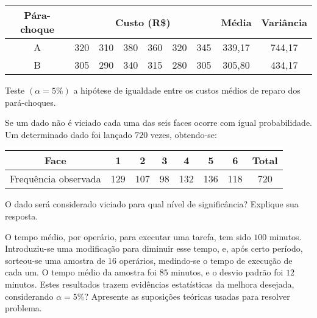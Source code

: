 \documentclass{report}
\begin{document}
\begin{Exercise}
\begin{table}[H]
\centering
\begin{tabular}{ccccccccc}
\hline \hline
Pára-choque&\multicolumn{6}{c}{Custo (R\$)}&Média & Variância\\
\hline
A       & 320  &310 & 380 & 360 & 320 & 345 & 339,17 & 744,17      \\
B       & 305  &290 & 340 & 315 & 280 & 305 & 305,80 & 434,17     \\
\hline \hline
\end{tabular}
\end{table}

Teste $(\alpha=5\%)$ a hipótese de igualdade entre os custos médios de reparo dos pará-choques.

\Question Se um dado não é viciado cada uma das seis faces ocorre com igual probabilidade. Um determinado dado foi lançado $720$ vezes, obtendo-se:

\begin{table}[H]
\centering
\begin{tabular}{c|ccccccc}
\hline \hline
Face                               &1     &2      & 3   & 4     & 5      & 6     &Total\\
\hline
Frequência observada & 129 &107 & 98 & 132 & 136 & 118 & 720 \\
\hline \hline
\end{tabular}
\end{table}
O dado será considerado viciado para qual nível de significância? Explique sua resposta. 

\Question O tempo médio, por operário, para executar uma tarefa, tem sido $100$ minutos. Introduziu-se uma modificação para diminuir esse tempo, e, após certo período, 
sorteou-se uma amostra de $16$ operários, medindo-se o tempo de execução de cada um. O tempo médio da amostra foi $85$ minutos, e o desvio padrão foi $12$ minutos. 
Estes resultados trazem evidências estatísticas da melhora desejada, considerando $\alpha=5\%$? Apresente as suposições teóricas usadas para resolver problema.

    \end{Exercise}
\end{document}
